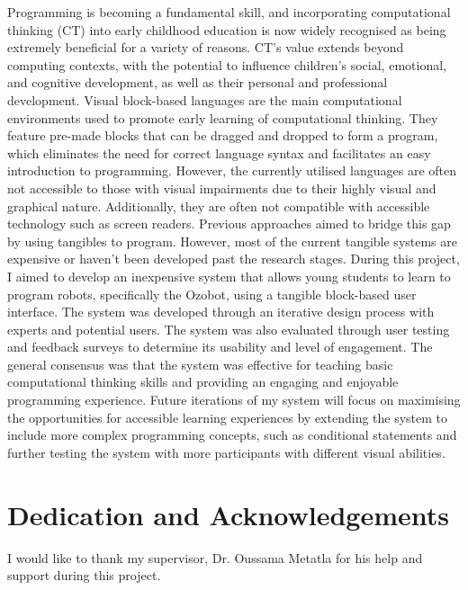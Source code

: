 \documentclass[oneside,%
                    author={Malak Hajji},
                    degree={BSc},
                    title={Designing An Accessible Ozobot Programming Platform for Students},
                  subtitle={With Mixed Visual Abilities}]{dissertation}
\begin{document}
\noindent
Programming is becoming a fundamental skill, and incorporating computational thinking (CT) into early childhood education is now widely recognised as being extremely beneficial for a variety of reasons. CT's value extends beyond computing contexts, with the potential to influence children's social, emotional, and cognitive development, as well as their personal and professional development. Visual block-based languages are the main computational environments used to promote early learning of computational thinking. They feature pre-made blocks that can be dragged and dropped to form a program, which eliminates the need for correct language syntax and facilitates an easy introduction to programming. However, the currently utilised languages are often not accessible to those with visual impairments due to their highly visual and graphical nature. Additionally, they are often not compatible with accessible technology such as screen readers. Previous approaches aimed to bridge this gap by using tangibles to program. However, most of the current tangible systems are expensive or haven't been developed past the research stages. During this project, I aimed to develop an inexpensive system that allows young students to learn to program robots, specifically the Ozobot, using a tangible block-based user interface.  The system was developed through an iterative design process with experts and potential users. The system was also evaluated through user testing and feedback surveys to determine its usability and level of engagement. The general consensus was that the system was effective for teaching basic computational thinking skills and providing an engaging and enjoyable programming experience. Future iterations of my system will focus on maximising the opportunities for accessible learning experiences by extending the system to include more complex programming concepts, such as conditional statements and further testing the system with more participants with different visual abilities.



\chapter*{Dedication and Acknowledgements}


\vspace{1cm} 

\noindent

I would like to thank my supervisor, Dr. Oussama Metatla for his help and support during this project.
\end{document}
